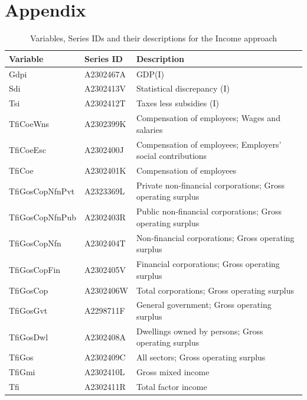 \documentclass[graybox]{svmult}
\begin{document}
\clearpage




\clearpage

\section*{Appendix}

\begin{table}[!h]
	\caption{Variables, Series IDs and their descriptions for the Income approach}
	\small
	\centering
	\begin{tabular*}{\columnwidth}[width = \textwidth]{lll}
		\toprule
		\textbf{Variable} & \textbf{Series ID} & \textbf{Description}\\
		\midrule
    Gdpi            & A2302467A & GDP(I)\\
    Sdi             & A2302413V & Statistical discrepancy (I)\\
    Tsi             & A2302412T & Taxes less subsidies (I)\\
    TfiCoeWns       & A2302399K & Compensation of employees; Wages and salaries\\
    TfiCoeEsc       & A2302400J & Compensation of employees; Employers' social contributions\\
		\addlinespace
    TfiCoe          & A2302401K & Compensation of employees\\
    TfiGosCopNfnPvt & A2323369L & Private non-financial corporations; Gross operating surplus\\
    TfiGosCopNfnPub & A2302403R & Public non-financial corporations; Gross operating surplus\\
    TfiGosCopNfn    & A2302404T & Non-financial corporations; Gross operating surplus\\
    TfiGosCopFin    & A2302405V & Financial corporations; Gross operating surplus\\
		\addlinespace
    TfiGosCop       & A2302406W & Total corporations; Gross operating surplus\\
    TfiGosGvt       & A2298711F & General government; Gross operating surplus\\
    TfiGosDwl       & A2302408A & Dwellings owned by persons; Gross operating surplus\\
    TfiGos          & A2302409C & All sectors; Gross operating surplus\\
    TfiGmi          & A2302410L & Gross mixed income\\
    Tfi             & A2302411R & Total factor income\\
		\bottomrule
	\end{tabular*}
	\label{Tab: Income-hierarchy}
\end{table}
\end{document}
